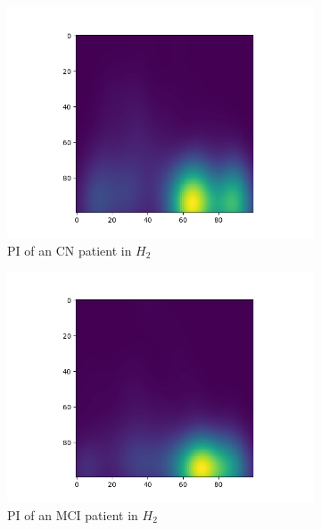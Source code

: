 \documentclass{article}
\begin{document}
\begin{figure}
\begin{subfigure}{0.3\textwidth}
    \includegraphics[width=\textwidth]{figures/PIs/Persistence_image_CN_h_2.png}
    \caption{PI of an CN patient in $H_2$}
  \end{subfigure}
  \begin{subfigure}{0.3\textwidth}
    \includegraphics[width=\textwidth]{figures/PIs/Persistence_image_MCI_h_2.png}
    \caption{PI of an MCI patient in $H_2$}
  \end{subfigure}
  \begin{subfigure}{0.3\textwidth}

\end{subfigure}
\end{figure}
\end{document}
